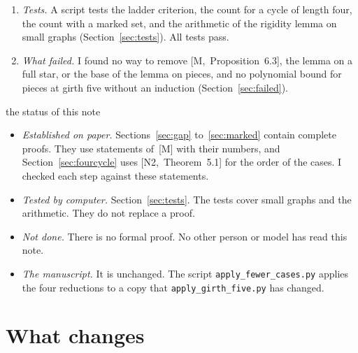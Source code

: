 \documentclass[11pt]{article}
\newcommand{\M}[1]{[M,~#1]}
\newcommand{\NN}[1]{[N2,~#1]}
\begin{document}
\begin{enumerate}[leftmargin=1.6em]
in the place of $\frac1{16}$. So Section~6 has a small number $\varepsilon_0=\gamma_0/20$ in the
place of $\frac1{1000}$, and the gap theorem now depends on the forest estimate. The text differs
more from the formal proof.
\item \emph{Tests.} A script tests the ladder criterion, the count for a cycle of length four,
the count with a marked set, and the arithmetic of the rigidity lemma on small graphs
(Section~\ref{sec:tests}). All tests pass.
\item \emph{What failed.} I found no way to remove \M{Proposition~6.3}, the lemma on a full
star, or the base of the lemma on pieces, and no polynomial bound for pieces at girth five
without an induction (Section~\ref{sec:failed}).
\end{enumerate}

\begin{notation}{the status of this note}
\begin{itemize}[leftmargin=1.2em]
\item \emph{Established on paper.} Sections~\ref{sec:gap} to~\ref{sec:marked} contain complete
proofs. They use statements of~[M] with their numbers, and Section~\ref{sec:fourcycle} uses
\NN{Theorem~5.1} for the order of the cases. I checked each step against these statements.
\item \emph{Tested by computer.} Section~\ref{sec:tests}. The tests cover small graphs and the
arithmetic. They do not replace a proof.
\item \emph{Not done.} There is no formal proof. No other person or model has read this note.
\item \emph{The manuscript.} It is unchanged. The script \texttt{apply\_fewer\_cases.py} applies
the four reductions to a copy that \texttt{apply\_girth\_five.py} has changed.
\end{itemize}
\end{notation}

\contentsblock

\section{What changes}\label{sec:changes}
\end{document}
